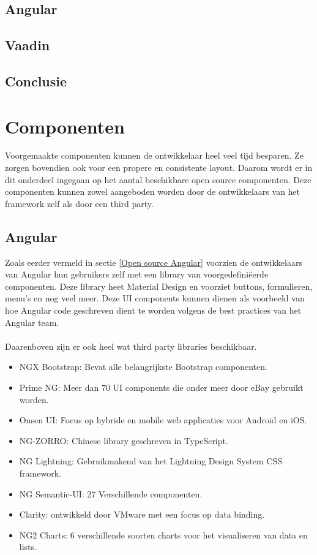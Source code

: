 \subsection{Angular}

\subsection{Vaadin}

\subsection{Conclusie}

\section{ Componenten}
Voorgemaakte componenten kunnen de ontwikkelaar heel veel tijd besparen. Ze zorgen bovendien ook voor een propere en consistente layout. Daarom wordt er in dit onderdeel ingegaan op het aantal beschikbare open source componenten. Deze componenten kunnen zowel aangeboden worden door de ontwikkelaars van het framework zelf als door een third party.

\subsection{Angular}
Zoals eerder vermeld in sectie \ref{Open source Angular} voorzien de ontwikkelaars van Angular hun gebruikers zelf met een library van voorgedefiniëerde componenten. Deze library heet Material Design en voorziet buttons, formulieren, menu's en nog veel meer. Deze UI components kunnen dienen als voorbeeld van hoe Angular code geschreven dient te worden volgens de best practices van het Angular team.
\\ \\
Daarenboven zijn er ook heel wat third party libraries beschikbaar. 
\begin{itemize}
	\item NGX Bootstrap: Bevat alle belangrijkste Bootstrap componenten.
	\item Prime NG: Meer dan 70 UI components die onder meer door eBay gebruikt worden. 
	\item Onsen UI: Focus op hybride en mobile web applicaties voor Android en iOS.
	\item NG-ZORRO: Chinese library geschreven in TypeScript.
	\item NG Lightning: Gebruikmakend van het Lightning Design System CSS framework.
	\item NG Semantic-UI: 27 Verschillende componenten.
	\item Clarity: ontwikkeld door VMware met een focus op data binding.
	\item NG2 Charts: 6 verschillende soorten charts voor het visualiseren van data en lists.
\end{itemize}

